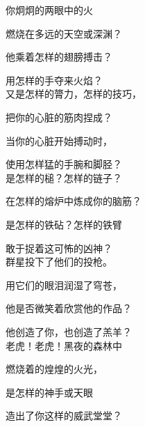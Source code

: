 { 
 
 
 你炯炯的两眼中的火
 
 燃烧在多远的天空或深渊？
 
 他乘着怎样的翅膀搏击？
 
 用怎样的手夺来火焰？\\
 
 
 
 
 又是怎样的膂力，怎样的技巧，
 
 把你的心脏的筋肉捏成？
 
 当你的心脏开始搏动时，
 
 使用怎样猛的手腕和脚胫？\\
 
 
 
 
 是怎样的槌？怎样的链子？
 
 在怎样的熔炉中炼成你的脑筋？
 
 是怎样的铁砧？怎样的铁臂
 
 敢于捉着这可怖的凶神？\\
 
 
 
 
 群星投下了他们的投枪。
 
 用它们的眼泪润湿了穹苍，
 
 他是否微笑着欣赏他的作品？
 
 他创造了你，也创造了羔羊？\\
 
 
 
 老虎！老虎！黑夜的森林中
 
 燃烧着的煌煌的火光，
 
 是怎样的神手或天眼
 
 造出了你这样的威武堂堂？
 
}
